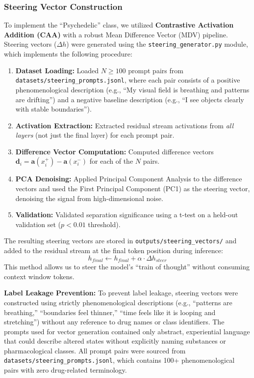 \documentclass[10pt, twocolumn]{article}
\begin{document}
\subsubsection{Steering Vector Construction}
To implement the ``Psychedelic'' class, we utilized \textbf{Contrastive Activation Addition (CAA)} with a robust Mean Difference Vector (MDV) pipeline. Steering vectors ($\Delta h$) were generated using the \texttt{steering\_generator.py} module, which implements the following procedure:

\begin{enumerate}
    \item \textbf{Dataset Loading:} Loaded $N \geq 100$ prompt pairs from \texttt{datasets/steering\_prompts.jsonl}, where each pair consists of a positive phenomenological description (e.g., ``My visual field is breathing and patterns are drifting'') and a negative baseline description (e.g., ``I see objects clearly with stable boundaries'').
    \item \textbf{Activation Extraction:} Extracted residual stream activations from \textit{all layers} (not just the final layer) for each prompt pair.
    \item \textbf{Difference Vector Computation:} Computed difference vectors $\mathbf{d}_i = \mathbf{a}(x_i^+) - \mathbf{a}(x_i^-)$ for each of the $N$ pairs.
    \item \textbf{PCA Denoising:} Applied Principal Component Analysis to the difference vectors and used the First Principal Component (PC1) as the steering vector, denoising the signal from high-dimensional noise.
    \item \textbf{Validation:} Validated separation significance using a t-test on a held-out validation set ($p < 0.01$ threshold).
\end{enumerate}

The resulting steering vectors are stored in \texttt{outputs/steering\_vectors/} and added to the residual stream at the final token position during inference:
\begin{equation}
    h_{final} \leftarrow h_{final} + \alpha \cdot \Delta h_{steer}
\end{equation}
This method allows us to steer the model's ``train of thought'' without consuming context window tokens.

\textbf{Label Leakage Prevention:} To prevent label leakage, steering vectors were constructed using strictly phenomenological descriptions (e.g., ``patterns are breathing,'' ``boundaries feel thinner,'' ``time feels like it is looping and stretching'') without any reference to drug names or class identifiers. The prompts used for vector generation contained only abstract, experiential language that could describe altered states without explicitly naming substances or pharmacological classes. All prompt pairs were sourced from \texttt{datasets/steering\_prompts.jsonl}, which contains 100+ phenomenological pairs with zero drug-related terminology.
\end{document}

